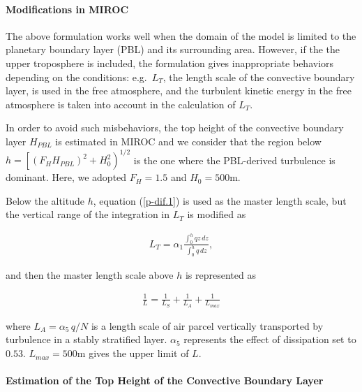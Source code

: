 \hypertarget{modifications-in-miroc}{%
\paragraph{Modifications in MIROC}\label{modifications-in-miroc}}

The above formulation works well when the domain of the model is limited
to the planetary boundary layer (PBL) and its surrounding area. However,
if the the upper troposphere is included, the formulation gives
inappropriate behaviors depending on the conditions: e.g.~\(L_T\), the
length scale of the convective boundary layer, is used in the free
atmosphere, and the turbulent kinetic energy in the free atmosphere is
taken into account in the calculation of \(L_T\).

In order to avoid such misbehaviors, the top height of the convective
boundary layer \(H_{PBL}\) is estimated in MIROC and we consider that
the region below \(h=\left[(F_H H_{PBL})^2+H_0^2\right)^{1/2}\) is the
one where the PBL-derived turbulence is dominant. Here, we adopted
\(F_H=1.5\) and \(H_0=500\)m.

Below the altitude \(h\), equation (\ref{p-dif.1}) is used as the
master length scale, but the vertical range of the integration in
\(L_T\) is modified as

\begin{eqnarray}L_T=\alpha_1\frac{\displaystyle \int_0^h{qz}\,dz}{\displaystyle \int_0^h{q}\,dz},\end{eqnarray}

and then the master length scale above \(h\) is represented as

\begin{eqnarray}\frac{1}{L}=\frac{1}{L_S}+\frac{1}{L_A}+\frac{1}{L_{max}}\end{eqnarray}

where \(L_A=\alpha_5\,q/N\) is a length scale of air parcel vertically
transported by turbulence in a stably stratified layer. \(\alpha_5\)
represents the effect of dissipation set to \(0.53\). \(L_{max}=500\)m
gives the upper limit of \(L\).

\hypertarget{estimation-of-the-top-height-of-the-convective-boundary-layer}{%
\paragraph{Estimation of the Top Height of the Convective Boundary
Layer}\label{estimation-of-the-top-height-of-the-convective-boundary-layer}}

